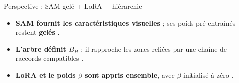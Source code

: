 \begin{frame}[t]{Perspective : SAM gelé + LoRA + hiérarchie}
    \vspace{-0.08cm}
    \begin{center}
        \resizebox{0.61\textwidth}{!}{}
    \end{center}

    \vspace{0.06cm}
    \small
    \begin{itemize}
        \setlength{\itemsep}{5pt}
        \item \textbf{SAM fournit les caractéristiques visuelles} ; ses poids pré-entraînés
        restent \textbf{gelés} .
        \item \textbf{L'arbre définit $B_H$} : il rapproche les zones reliées par une chaîne
        de raccords compatibles .
        \item \textbf{LoRA et le poids $\beta$ sont appris ensemble}, avec $\beta$ initialisé
        à zéro .
    \end{itemize}

\end{frame}
